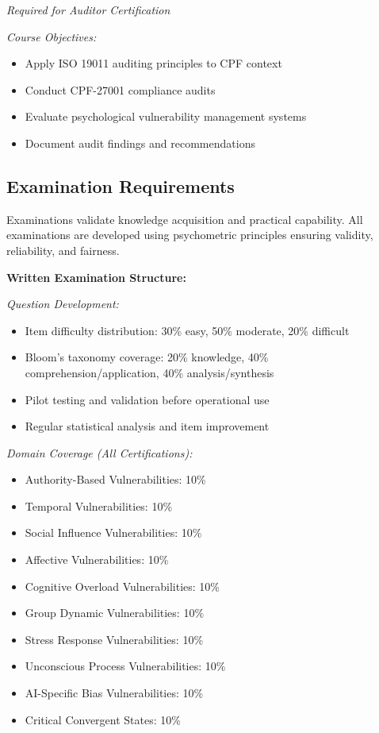 \documentclass[11pt,a4paper]{article}
\begin{document}
\textit{Required for Auditor Certification}

\textit{Course Objectives:}
\begin{itemize}
\item Apply ISO 19011 auditing principles to CPF context
\item Conduct CPF-27001 compliance audits
\item Evaluate psychological vulnerability management systems
\item Document audit findings and recommendations
\end{itemize}

\subsection{Examination Requirements}

Examinations validate knowledge acquisition and practical capability. All examinations are developed using psychometric principles ensuring validity, reliability, and fairness.

\textbf{Written Examination Structure:}

\textit{Question Development:}
\begin{itemize}
\item Item difficulty distribution: 30\% easy, 50\% moderate, 20\% difficult
\item Bloom's taxonomy coverage: 20\% knowledge, 40\% comprehension/application, 40\% analysis/synthesis
\item Pilot testing and validation before operational use
\item Regular statistical analysis and item improvement
\end{itemize}

\textit{Domain Coverage (All Certifications):}
\begin{itemize}
\item Authority-Based Vulnerabilities: 10\%
\item Temporal Vulnerabilities: 10\%
\item Social Influence Vulnerabilities: 10\%
\item Affective Vulnerabilities: 10\%
\item Cognitive Overload Vulnerabilities: 10\%
\item Group Dynamic Vulnerabilities: 10\%
\item Stress Response Vulnerabilities: 10\%
\item Unconscious Process Vulnerabilities: 10\%
\item AI-Specific Bias Vulnerabilities: 10\%
\item Critical Convergent States: 10\%
\end{itemize}
\end{document}
